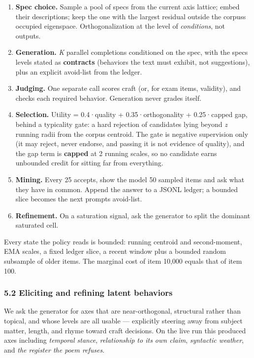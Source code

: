 \documentclass[
  11pt,
]{article}
\providecommand{\tightlist}{%
  \setlength{\itemsep}{0pt}\setlength{\parskip}{0pt}}
\theoremstyle{plain}
\theoremstyle{definition}
\providecommand{\tightlist}{%
  \setlength{\itemsep}{0pt}\setlength{\parskip}{0pt}}
\begin{document}
\begin{enumerate}
\def\labelenumi{\arabic{enumi}.}
\tightlist
\item
  \textbf{Spec choice.} Sample a pool of specs from the current axis
  lattice; embed their descriptions; keep the one with the largest
  residual outside the corpus\textquotesingle s occupied eigenspace.
  Orthogonalization at the level of \emph{conditions}, not outputs.
\item
  \textbf{Generation.} \emph{K} parallel completions conditioned on the
  spec, with the spec\textquotesingle s levels stated as
  \textbf{contracts} (behaviors the text must exhibit, not suggestions),
  plus an explicit avoid-list from the ledger.
\item
  \textbf{Judging.} One separate call scores craft (or, for exam items,
  validity), and checks each required behavior. Generation never grades
  itself.
\item
  \textbf{Selection.} Utility = 0.4·quality + 0.35·orthogonality +
  0.25·capped gap, behind a typicality gate: a hard rejection of
  candidates lying beyond \emph{z} running radii from the corpus
  centroid. The gate is negative supervision only (it may reject, never
  endorse, and passing it is not evidence of quality), and the gap term
  is \textbf{capped} at 2 running scales, so no candidate earns
  unbounded credit for sitting far from everything.
\item
  \textbf{Mining.} Every 25 accepts, show the model 50 sampled items and
  ask what they have in common. Append the answer to a JSONL ledger; a
  bounded slice becomes the next prompts\textquotesingle{} avoid-list.
\item
  \textbf{Refinement.} On a saturation signal, ask the generator to
  split the dominant saturated cell.
\end{enumerate}

Every state the policy reads is bounded: running centroid and
second-moment, EMA scales, a fixed ledger slice, a recent window plus a
bounded random subsample of older items. The marginal cost of item
10,000 equals that of item 100.

\subsubsection{5.2 Eliciting and refining latent
behaviors}\label{52-eliciting-and-refining-latent-behaviors}

We ask the generator for axes that are near-orthogonal, structural
rather than topical, and whose levels are all usable --- explicitly
steering away from subject matter, length, and rhyme toward craft
decisions. On the live run this produced axes including \emph{temporal
stance}, \emph{relationship to its own claim}, \emph{syntactic weather},
and \emph{the register the poem refuses}.
\end{document}
